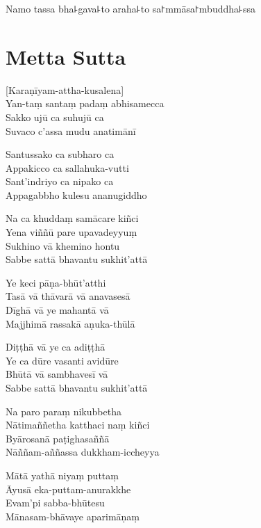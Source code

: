 \documentclass[
  babelLanguage=portuguese,
  final,
]{chantingbook}
\begin{document}
Namo tassa bha꜕gava꜕to araha꜕to sa꜓mmāsa꜓mbuddha꜕ssa


\artoptfalse

\chapter[Metta Sutta]{Metta Sutta}

\begin{leader}
\end{leader}

[Karaṇīyam-attha-kusalena]\\
Yan-taṃ santaṃ padaṃ abhisamecca\\
Sakko ujū ca suhujū ca\\
Suvaco c'assa mudu anatimānī

Santussako ca subharo ca\\
Appakicco ca sallahuka-vutti\\
Sant'indriyo ca nipako ca\\
Appagabbho kulesu ananugiddho

Na ca khuddaṃ samācare kiñci\\
Yena viññū pare upavadeyyuṃ\\
Sukhino vā khemino hontu\\
Sabbe sattā bhavantu sukhit'attā

Ye keci pāṇa-bhūt'atthi\\
Tasā vā thāvarā vā anavasesā\\
Dīghā vā ye mahantā vā\\
Majjhimā rassakā aṇuka-thūlā

Diṭṭhā vā ye ca adiṭṭhā\\
Ye ca dūre vasanti avidūre\\
Bhūtā vā sambhavesī vā\\
Sabbe sattā bhavantu sukhit'attā

\enlargethispage{\baselineskip}

Na paro paraṃ nikubbetha\\
Nātimaññetha katthaci naṃ kiñci\\
Byārosanā paṭighasaññā\\
Nāññam-aññassa dukkham-iccheyya

\clearpage

Mātā yathā niyaṃ puttaṃ\\
Āyusā eka-puttam-anurakkhe\\
Evam'pi sabba-bhūtesu\\
Mānasam-bhāvaye aparimāṇaṃ
\end{document}
